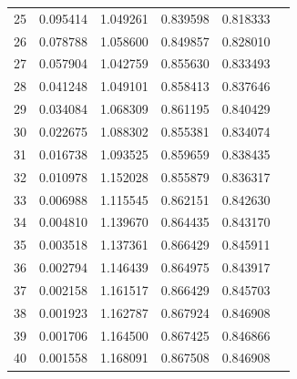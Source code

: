 \begin{table}[ht]
{\begin{tabular}{c c c c c c}
25 & 0.095414 & 1.049261 & 0.839598 & 0.818333 \\
26 & 0.078788 & 1.058600 & 0.849857 & 0.828010 \\
27 & 0.057904 & 1.042759 & 0.855630 & 0.833493 \\
28 & 0.041248 & 1.049101 & 0.858413 & 0.837646 \\
29 & 0.034084 & 1.068309 & 0.861195 & 0.840429 \\
30 & 0.022675 & 1.088302 & 0.855381 & 0.834074 \\
31 & 0.016738 & 1.093525 & 0.859659 & 0.838435 \\
32 & 0.010978 & 1.152028 & 0.855879 & 0.836317 \\
33 & 0.006988 & 1.115545 & 0.862151 & 0.842630 \\
34 & 0.004810 & 1.139670 & 0.864435 & 0.843170 \\
35 & 0.003518 & 1.137361 & 0.866429 & 0.845911 \\
36 & 0.002794 & 1.146439 & 0.864975 & 0.843917 \\
37 & 0.002158 & 1.161517 & 0.866429 & 0.845703 \\
38 & 0.001923 & 1.162787 & 0.867924 & 0.846908 \\
39 & 0.001706 & 1.164500 & 0.867425 & 0.846866 \\
40 & 0.001558 & 1.168091 & 0.867508 & 0.846908 \\
\hline
\end{tabular}
}
\end{table}


